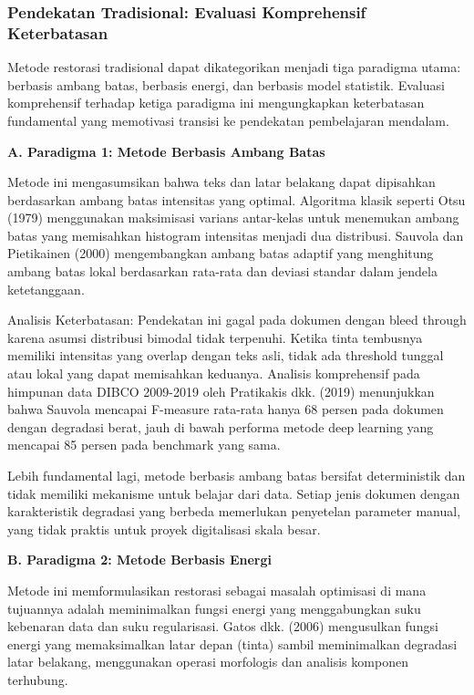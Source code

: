\documentclass[12pt,a4paper]{article}
\begin{document}
\subsubsection{Pendekatan Tradisional: Evaluasi Komprehensif Keterbatasan}
\label{subsubsec:pendekatan-tradisional}

\vspace{1.5ex}

Metode restorasi tradisional dapat dikategorikan menjadi tiga paradigma utama: berbasis ambang batas, berbasis energi, dan berbasis model statistik. Evaluasi komprehensif terhadap ketiga paradigma ini mengungkapkan keterbatasan fundamental yang memotivasi transisi ke pendekatan pembelajaran mendalam.

\vspace{0.5ex}
\noindent\textbf{A. Paradigma 1: Metode Berbasis Ambang Batas}

Metode ini mengasumsikan bahwa teks dan latar belakang dapat dipisahkan berdasarkan ambang batas intensitas yang optimal. Algoritma klasik seperti Otsu (1979) menggunakan maksimisasi varians antar-kelas untuk menemukan ambang batas yang memisahkan histogram intensitas menjadi dua distribusi. Sauvola dan Pietikainen (2000) mengembangkan ambang batas adaptif yang menghitung ambang batas lokal berdasarkan rata-rata dan deviasi standar dalam jendela ketetanggaan.

Analisis Keterbatasan: Pendekatan ini gagal pada dokumen dengan bleed through karena asumsi distribusi bimodal tidak terpenuhi. Ketika tinta tembusnya memiliki intensitas yang overlap dengan teks asli, tidak ada threshold tunggal atau lokal yang dapat memisahkan keduanya. Analisis komprehensif pada himpunan data DIBCO 2009-2019 oleh Pratikakis dkk. (2019) menunjukkan bahwa Sauvola mencapai F-measure rata-rata hanya 68 persen pada dokumen dengan degradasi berat, jauh di bawah performa metode deep learning yang mencapai 85 persen pada benchmark yang sama.

Lebih fundamental lagi, metode berbasis ambang batas bersifat deterministik dan tidak memiliki mekanisme untuk belajar dari data. Setiap jenis dokumen dengan karakteristik degradasi yang berbeda memerlukan penyetelan parameter manual, yang tidak praktis untuk proyek digitalisasi skala besar.

\vspace{0.5ex}
\noindent\textbf{B. Paradigma 2: Metode Berbasis Energi}

Metode ini memformulasikan restorasi sebagai masalah optimisasi di mana tujuannya adalah meminimalkan fungsi energi yang menggabungkan suku kebenaran data dan suku regularisasi. Gatos dkk. (2006) mengusulkan fungsi energi yang memaksimalkan latar depan (tinta) sambil meminimalkan degradasi latar belakang, menggunakan operasi morfologis dan analisis komponen terhubung.
\end{document}
